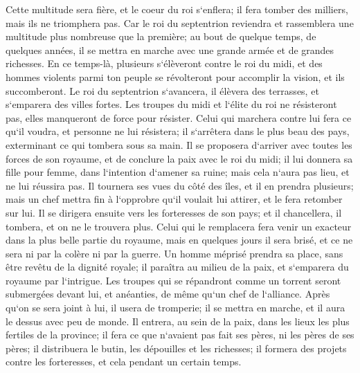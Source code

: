 \verse Cette multitude sera fière, et le coeur du roi s`enflera; il fera tomber des milliers, mais ils ne triomphera pas. 
\verse Car le roi du septentrion reviendra et rassemblera une multitude plus nombreuse que la première; au bout de quelque temps, de quelques années, il se mettra en marche avec une grande armée et de grandes richesses. 
\verse En ce temps-là, plusieurs s`élèveront contre le roi du midi, et des hommes violents parmi ton peuple se révolteront pour accomplir la vision, et ils succomberont. 
\verse Le roi du septentrion s`avancera, il élèvera des terrasses, et s`emparera des villes fortes. Les troupes du midi et l`élite du roi ne résisteront pas, elles manqueront de force pour résister. 
\verse Celui qui marchera contre lui fera ce qu`il voudra, et personne ne lui résistera; il s`arrêtera dans le plus beau des pays, exterminant ce qui tombera sous sa main. 
\verse Il se proposera d`arriver avec toutes les forces de son royaume, et de conclure la paix avec le roi du midi; il lui donnera sa fille pour femme, dans l`intention d`amener sa ruine; mais cela n`aura pas lieu, et ne lui réussira pas. 
\verse Il tournera ses vues du côté des îles, et il en prendra plusieurs; mais un chef mettra fin à l`opprobre qu`il voulait lui attirer, et le fera retomber sur lui. 
\verse Il se dirigera ensuite vers les forteresses de son pays; et il chancellera, il tombera, et on ne le trouvera plus. 
\verse Celui qui le remplacera fera venir un exacteur dans la plus belle partie du royaume, mais en quelques jours il sera brisé, et ce ne sera ni par la colère ni par la guerre. 
\verse Un homme méprisé prendra sa place, sans être revêtu de la dignité royale; il paraîtra au milieu de la paix, et s`emparera du royaume par l`intrigue. 
\verse Les troupes qui se répandront comme un torrent seront submergées devant lui, et anéanties, de même qu`un chef de l`alliance. 
\verse Après qu`on se sera joint à lui, il usera de tromperie; il se mettra en marche, et il aura le dessus avec peu de monde. 
\verse Il entrera, au sein de la paix, dans les lieux les plus fertiles de la province; il fera ce que n`avaient pas fait ses pères, ni les pères de ses pères; il distribuera le butin, les dépouilles et les richesses; il formera des projets contre les forteresses, et cela pendant un certain temps. 
